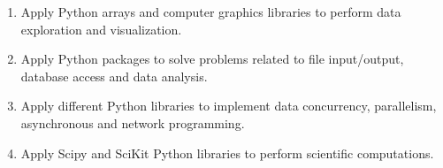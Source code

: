 \documentclass[12pt]{article}
\begin{document}

\vspace{0.3cm}


\begin{enumerate}[noitemsep,nolistsep, leftmargin=*]
\item Apply Python arrays and computer graphics libraries to perform data exploration and visualization.
\item Apply Python packages to solve problems related to file input/output, database access and data analysis.
\item Apply different Python libraries to implement data concurrency, parallelism, asynchronous and network programming.
\item Apply Scipy and SciKit Python libraries to perform scientific computations.
\end{enumerate}
\vspace{0.3cm}

\end{document}
